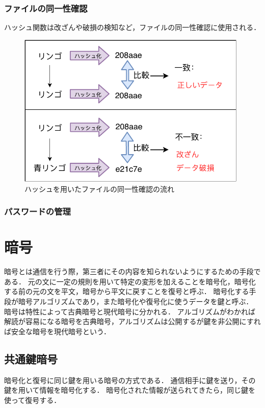 \documentclass[a4j,12pt]{jsarticle}
\begin{document}
\subsubsection{ファイルの同一性確認}


ハッシュ関数は改ざんや破損の検知など，ファイルの同一性確認に使用される．


\begin{figure}[H]
\centering
\includegraphics[width=11cm]{hash.pdf}
\caption{ハッシュを用いたファイルの同一性確認の流れ}
\label{fig:no}
\end{figure} 

\subsubsection{パスワードの管理}


\newpage
\section{暗号}
暗号とは通信を行う際，第三者にその内容を知られないようにするための手段である．
元の文に一定の規則を用いて特定の変形を加えることを暗号化，暗号化する前の元の文を平文，暗号から平文に戻すことを復号と呼ぶ．
暗号化する手段が暗号アルゴリズムであり，また暗号化や復号化に使うデータを鍵と呼ぶ．
暗号は特性によって古典暗号と現代暗号に分かれる．
アルゴリズムがわかれば解読が容易になる暗号を古典暗号，アルゴリズムは公開するが鍵を非公開にすれば安全な暗号を現代暗号という．

\newpage
\subsection{共通鍵暗号}
暗号化と復号に同じ鍵を用いる暗号の方式である．
通信相手に鍵を送り，その鍵を用いて情報を暗号化する．
暗号化された情報が送られてきたら，同じ鍵を使って復号する．
\end{document}
